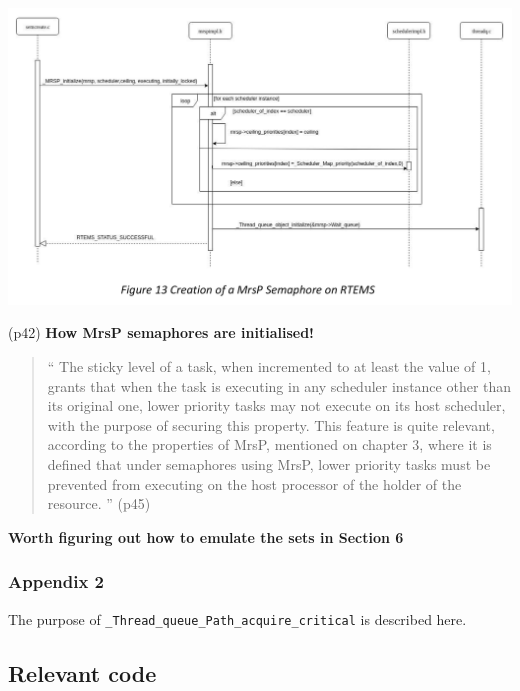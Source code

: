\includegraphics[width=\textwidth]{../images/create-MrsP-semaphore-Gomes-2019.png}

(p42) \textbf{How MrsP semaphores are initialised!}

\begin{quotation}
``
The sticky level of a task,
when incremented to at least the value of 1,
grants that when the task is executing
in any scheduler instance other than its original one,
lower priority tasks may not execute on its host scheduler,
with the purpose of securing this property.
This feature is quite relevant,
according to the properties of MrsP,
mentioned on chapter 3,
where it is defined that under semaphores using MrsP,
lower priority tasks must be
prevented from executing on the host processor of the holder of the resource.
'' (p45)
\end{quotation}


\textbf{Worth figuring out how to emulate the sets in Section 6}

\subsubsection{Appendix 2}

The purpose of \verb"_Thread_queue_Path_acquire_critical" is described here.


\subsection{Relevant code}
